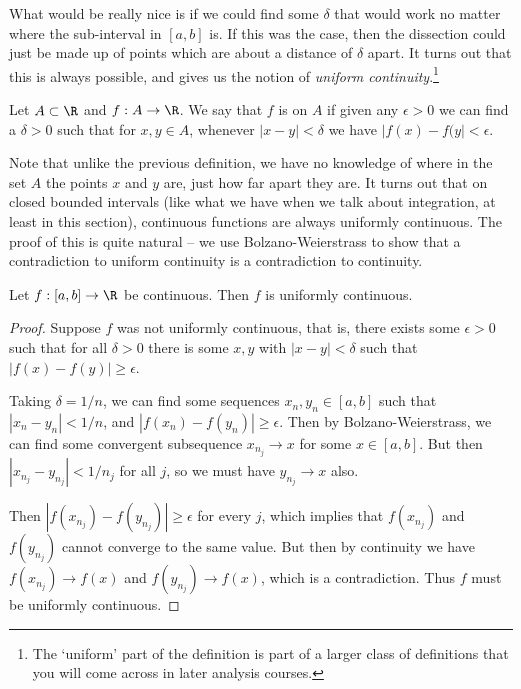 \documentclass[a4paper]{scrartcl}
\begin{document}
What would be really nice is if we could find some $\delta$ that would work no matter where the sub-interval in $[a, b]$ is. If this was the case, then the dissection could just be made up of points which are about a distance of $\delta$ apart. It turns out that this is always possible, and gives us the notion of \emph{uniform continuity}.\footnote{The `uniform' part of the definition is part of a larger class of definitions that you will come across in later analysis courses.}

\begin{definition}
	Let $A \subset \R$ and $f: A \rightarrow \R$. We say that $f$ is  on $A$ if given any $\epsilon  >0$ we can find a $\delta> 0$ such that for $x, y \in A$, whenever $|x - y| < \delta$ we have $|f(x) - f(y| < \epsilon$.
\end{definition}

Note that unlike the previous definition, we have no knowledge of where in the set $A$ the points $x$ and $y$ are, just how far apart they are. It turns out that on closed bounded intervals (like what we have when we talk about integration, at least in this section), continuous functions are always uniformly continuous.
The proof of this is quite natural -- we use Bolzano-Weierstrass to show that a contradiction to uniform continuity is a contradiction to continuity.

\begin{theorem}
	Let $f: [a, b] \rightarrow \R$ be continuous. Then $f$ is uniformly continuous.
\end{theorem}
\begin{proof}
	Suppose $f$ was not uniformly continuous, that is, there exists some $\epsilon > 0$ such that for all $\delta > 0$ there is some $x, y$ with $|x - y| < \delta$ such that $|f(x) - f(y)| \geq \epsilon$.

	Taking $\delta = 1/n$, we can find some sequences $x_n, y_n \in [a, b]$ such that $|x_n - y_n| < 1/n$, and $|f(x_n) - f(y_n)| \geq \epsilon$. Then by Bolzano-Weierstrass, we can find some convergent subsequence $x_{n_j} \rightarrow x$ for some $x \in [a, b]$. But then $|x_{n_j} - y_{n_j}| < 1/n_j$ for all $j$, so we must have $y_{n_j} \rightarrow x$ also.

	Then $|f(x_{n_j}) - f(y_{n_j})| \geq \epsilon$ for every $j$, which implies that $f(x_{n_j})$ and $f(y_{n_j})$ cannot converge to the same value. But then by continuity we have $f(x_{n_j}) \rightarrow f(x)$ and $f(y_{n_j}) \rightarrow f(x)$, which is a contradiction. Thus $f$ must be uniformly continuous.
\end{proof}
\end{document}

